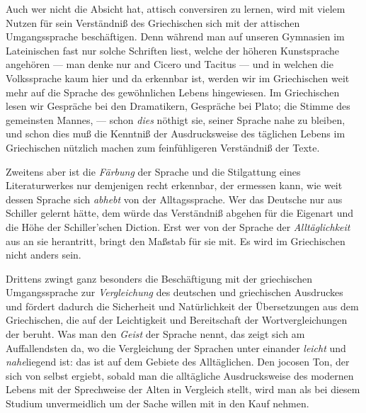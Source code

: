 Auch wer nicht die Absicht hat, attisch conversiren zu lernen, wird
mit vielem Nutzen für sein Verständniß des Griechischen sich mit der
attischen Umgangssprache beschäftigen. Denn während
man auf unseren Gymnasien im Lateinischen fast nur solche Schriften
liest, welche der höheren Kunstsprache angehören
--- man denke nur and Cicero und Tacitus --- und in welchen die Volkssprache
kaum hier und da erkennbar ist, werden wir im
Griechischen weit mehr auf die Sprache des gewöhnlichen Lebens hingewiesen.
Im Griechischen lesen wir Gespräche bei den Dramatikern, Gespräche
bei Plato; die Stimme des gemeinsten Mannes, --- schon \emph{dies}
nöthigt sie, seiner Sprache nahe zu bleiben, und schon dies muß die
Kenntniß der Ausdrucksweise
des täglichen Lebens im Griechischen nützlich machen zum feinfühligeren
Verständniß der Texte.

Zweitens aber ist die \emph{Färbung} der Sprache und die Stilgattung
eines Literaturwerkes nur demjenigen recht erkennbar,
der ermessen kann, wie weit dessen Sprache sich \emph{abhebt} von
der Alltagssprache. Wer das Deutsche nur aus Schiller
gelernt hätte, dem würde das Verständniß abgehen
für die Eigenart und die Höhe der Schiller'schen Diction. Erst wer
von der Sprache der \emph{Alltäglichkeit} aus an sie herantritt,
bringt den Maßstab für sie mit. Es wird im Griechischen nicht anders
sein.

Drittens zwingt ganz besonders die Beschäftigung mit der griechischen
Umgangssprache zur \emph{Vergleichung}
des deutschen und griechischen Ausdruckes und
fördert dadurch die Sicherheit und Natürlichkeit der Übersetzungen
aus dem Griechischen, die auf der Leichtigkeit und Bereitschaft
der Wortvergleichungen der
beruht. Was man den \emph{Geist} der Sprache nennt, das zeigt sich
am Auffallendsten da, wo die Vergleichung der
Sprachen unter einander \emph{leicht} und \emph{nahe}liegend ist:
das ist auf dem Gebiete des Alltäglichen. Den jocosen Ton, der sich
von selbst ergiebt, sobald man die alltägliche Ausdrucksweise
des modernen Lebens mit der Sprechweise der Alten in Vergleich stellt,
wird man als bei diesem Studium unvermeidlich um der Sache willen
mit in den Kauf nehmen.

